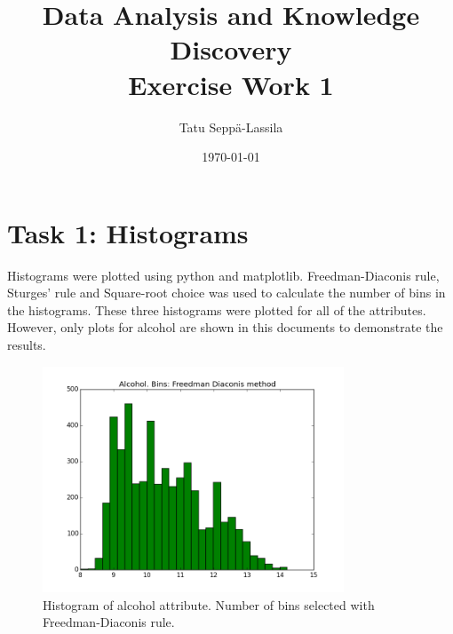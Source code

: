 \documentclass[12pt]{article}
\title{Data Analysis and Knowledge Discovery \\ Exercise Work 1} %
\author{Tatu Seppä-Lassila} %
\date{\today} %
\begin{document}
\maketitle %

 
\section{Task 1: Histograms}

Histograms were plotted using python and matplotlib. Freedman-Diaconis rule, Sturges' rule and Square-root choice was used to calculate the number of bins in the histograms. These three histograms were plotted for all of the attributes. However, only plots for alcohol are shown in this documents to demonstrate the results. 

\begin{figure}[H]
    \centering
    \includegraphics[width=0.8\textwidth]{alcohol_fdr}
    \caption{Histogram of alcohol attribute. Number of bins selected with Freedman-Diaconis rule.}
    \label{fig:histogram_fdr}
\end{figure}
\end{document}
